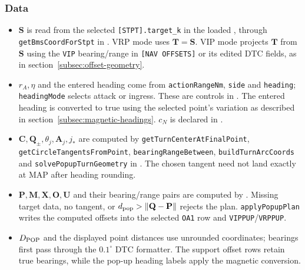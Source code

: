 \documentclass[10pt,a4paper]{amsart}
\begin{document}
\subsubsection*{Data}
\begin{itemize}
\setlength{\itemsep}{0pt}
\setlength{\parsep}{0pt}
\item $\mathbf S$ is read from the selected
\texttt{[STPT].target\_k} in the loaded ,
through \texttt{getBmsCoordForStpt} in .
VRP mode uses $\mathbf T=\mathbf S$.
VIP mode projects $\mathbf T$ from $\mathbf S$ using the
\texttt{VIP} bearing/range in \texttt{[NAV OFFSETS]} or its edited
DTC fields, as in section~\ref{subsec:offset-geometry}.
\item $r_A,\eta$ and the entered heading come from
\texttt{actionRangeNm}, \texttt{side} and \texttt{heading};
\texttt{headingMode} selects attack or ingress. These are controls
in . The entered heading is converted
to true using the selected point's variation as described in
section~\ref{subsec:magnetic-headings}. $c_N$ is declared in
.
\item $\mathbf C,\mathbf Q_\pm,\theta_j,\mathbf A_j,j_*$ are computed by
\texttt{getTurnCenterAtFinalPoint}, \texttt{getCircleTangentsFromPoint},
\texttt{bearingRangeBetween}, \texttt{buildTurnArcCoords} and
\texttt{solvePopupTurnGeometry} in .
The chosen tangent need not land exactly at MAP after heading rounding.
\item $\mathbf P,\mathbf M,\mathbf X,\mathbf O,\mathbf U$ and their
bearing/range pairs are computed by
. Missing target data,
no tangent, or $d_{\rm pop}>\|\mathbf Q-\mathbf P\|$ rejects the plan.
\texttt{applyPopupPlan} writes the computed offsets into the selected
\texttt{OA1} row and \texttt{VIPPUP}/\texttt{VRPPUP}.
\item $D_{\rm POP}$ and the displayed point distances use unrounded
coordinates; bearings first pass through the $0.1^\circ$ DTC
formatter. The support offset rows retain true bearings, while
the pop-up heading labels apply the magnetic conversion.
\end{itemize}
\end{document}
